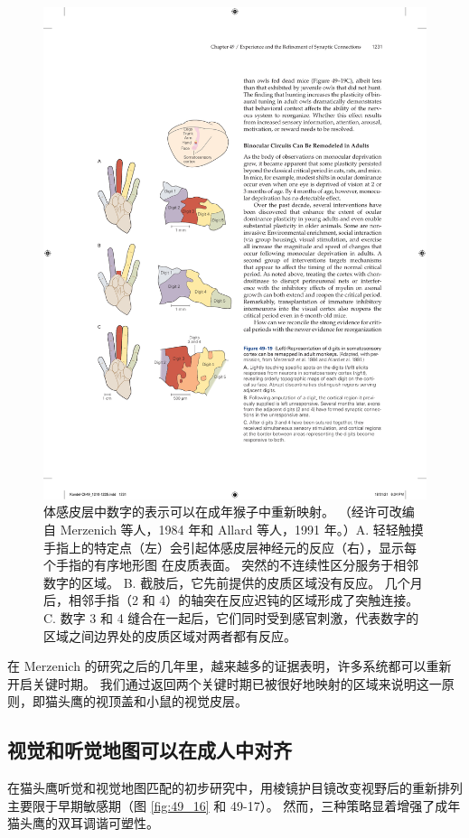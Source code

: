 \begin{figure}[htbp]
	\centering
	\includegraphics[width=0.5\linewidth]{chap49/fig_49_19}
	\caption{体感皮层中数字的表示可以在成年猴子中重新映射。 （经许可改编自 Merzenich 等人，1984 年和 Allard 等人，1991 年。）A. 轻轻触摸手指上的特定点（左）会引起体感皮层神经元的反应（右），显示每个手指的有序地形图 在皮质表面。 突然的不连续性区分服务于相邻数字的区域。 B. 截肢后，它先前提供的皮质区域没有反应。 几个月后，相邻手指（2 和 4）的轴突在反应迟钝的区域形成了突触连接。 C. 数字 3 和 4 缝合在一起后，它们同时受到感官刺激，代表数字的区域之间边界处的皮质区域对两者都有反应。}
	\label{fig:49_19}
\end{figure}

在 Merzenich 的研究之后的几年里，越来越多的证据表明，许多系统都可以重新开启关键时期。 我们通过返回两个关键时期已被很好地映射的区域来说明这一原则，即猫头鹰的视顶盖和小鼠的视觉皮层。

\subsection{视觉和听觉地图可以在成人中对齐}
在猫头鹰听觉和视觉地图匹配的初步研究中，用棱镜护目镜改变视野后的重新排列主要限于早期敏感期（图 \ref{fig:49_16} 和 49-17）。 然而，三种策略显着增强了成年猫头鹰的双耳调谐可塑性。

